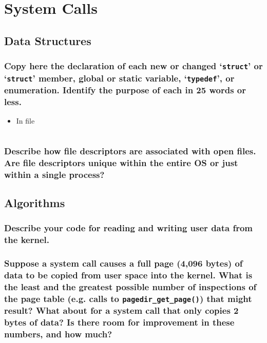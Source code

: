 \documentclass[sigconf, nonacm, balance=false, urlbreakonhyphens=true]{acmart}
\begin{document}
    \section{System Calls}

        \label{System Calls}

        \subsection{Data Structures}
            
            \subsubsection{Copy here the declaration of each new or changed `\texttt{struct}' or `\texttt{struct}' member, global or static variable, `\texttt{typedef}', or enumeration. Identify the purpose of each in 25 words or less. } 

                \begin{itemize}
                    \item In file \texttt{}
\begin{verbatim}
\end{verbatim}
                \end{itemize}

            \subsubsection{Describe how file descriptors are associated with open files.  Are file descriptors unique within the entire OS or just within a single process? }

        \subsection{Algorithms}

            \subsubsection{Describe your code for reading and writing user data from the kernel. } 

            \subsubsection{Suppose a system call causes a full page (4,096 bytes) of data to be copied from user space into the kernel.  What is the least and the greatest possible number of inspections of the page table (e.g. calls to \texttt{pagedir\_get\_page()}) that might result?  What about for a system call that only copies 2 bytes of data?  Is there room for improvement in these numbers, and how much? }
\end{document}
